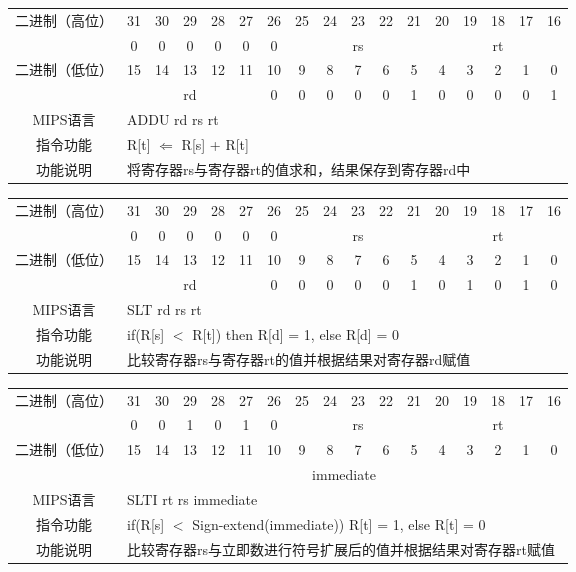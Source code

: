 \begin{table}

\begin{tabular}{|c|c|c|c|c|c|c|c|c|c|c|c|c|c|c|c|c|}
\hline
\multirow{2}{*}{二进制（高位）} &
31&30&29&28&27&26&25&24&23&22&21&20&19&18&17&16\\
\cline{2-17}
&0&0&0&0&0&0&
\multicolumn{5}{c|}{rs}&
\multicolumn{5}{c|}{rt}\\
\hline
\multirow{2}{*}{二进制（低位）} &
15&14&13&12&11&10&9&8&7&6&5&4&3&2&1&0\\
\cline{2-17}
&
\multicolumn{5}{c|}{rd}&
0&0&0&0&0&1&0&0&0&0&1\\
\hline
MIPS语言&
\multicolumn{16}{l|}{ADDU rd rs rt}\\
\hline
指令功能&
\multicolumn{16}{l|}{R[t] $\Leftarrow$ R[s] + R[t]}\\
\hline
功能说明&
\multicolumn{16}{l|}{将寄存器rs与寄存器rt的值求和，结果保存到寄存器rd中}\\
\hline
\end{tabular}
\end{table}
\begin{table}
\begin{tabular}{|c|c|c|c|c|c|c|c|c|c|c|c|c|c|c|c|c|}
\hline
\multirow{2}{*}{二进制（高位）} &
31&30&29&28&27&26&25&24&23&22&21&20&19&18&17&16\\
\cline{2-17}
&0&0&0&0&0&0&
\multicolumn{5}{c|}{rs}&
\multicolumn{5}{c|}{rt}\\
\hline
\multirow{2}{*}{二进制（低位）} &
15&14&13&12&11&10&9&8&7&6&5&4&3&2&1&0\\
\cline{2-17}
&
\multicolumn{5}{c|}{rd}&
0&0&0&0&0&1&0&1&0&1&0\\
\hline
MIPS语言&
\multicolumn{16}{l|}{SLT rd rs rt}\\
\hline
指令功能&
\multicolumn{16}{l|}{if(R[s] $<$ R[t]) then R[d] = 1, else R[d] = 0}\\
\hline
功能说明&
\multicolumn{16}{l|}{比较寄存器rs与寄存器rt的值并根据结果对寄存器rd赋值}\\
\hline
\end{tabular}
\end{table}

\begin{table}
\begin{tabular}{|c|c|c|c|c|c|c|c|c|c|c|c|c|c|c|c|c|}
\hline
\multirow{2}{*}{二进制（高位）} &
31&30&29&28&27&26&25&24&23&22&21&20&19&18&17&16\\
\cline{2-17}
&0&0&1&0&1&0&
\multicolumn{5}{c|}{rs}&
\multicolumn{5}{c|}{rt}\\
\hline
\multirow{2}{*}{二进制（低位）} &
15&14&13&12&11&10&9&8&7&6&5&4&3&2&1&0\\
\cline{2-17}
&
\multicolumn{16}{c|}{immediate}\\
\hline
MIPS语言&
\multicolumn{16}{l|}{SLTI rt rs immediate}\\
\hline
指令功能&
\multicolumn{16}{l|}{if(R[s] $<$ Sign-extend(immediate)) R[t] = 1, else R[t] = 0}\\
\hline
功能说明&
\multicolumn{16}{l|}{比较寄存器rs与立即数进行符号扩展后的值并根据结果对寄存器rt赋值}\\
\hline
\end{tabular}
\end{table}

